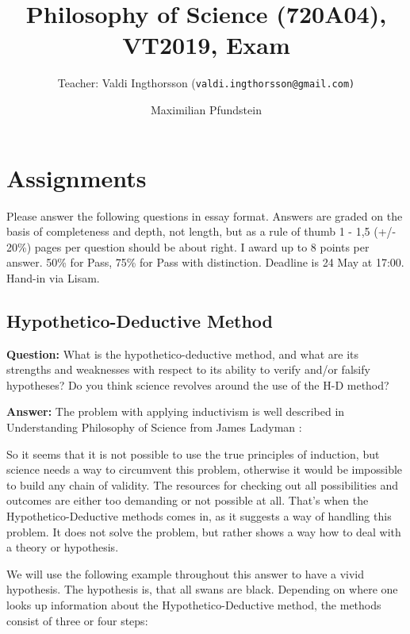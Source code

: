 \documentclass[11pt]{scrartcl}
\title{Philosophy of Science (720A04), VT2019, Exam}
\subtitle{Teacher: Valdi Ingthorsson (\texttt{valdi.ingthorsson@gmail.com)}}
\author{Maximilian Pfundstein}
\begin{document}
\maketitle

\tableofcontents

\newpage

\section{Assignments}

Please answer the following questions in essay format. Answers are graded on the basis of completeness and depth, not length, but as a rule of thumb 1 - 1,5 (+/- 20\%) pages per question should be about right. I award up to 8 points per answer. 50\% for Pass, 75\% for Pass with distinction. Deadline is 24 May at 17:00. Hand-in via Lisam.

\subsection{Hypothetico-Deductive Method}

\textbf{Question:} What is the hypothetico-deductive method, and what are its strengths and weaknesses with respect to its ability to verify and/or falsify hypotheses? Do you think science revolves around the use of the H-D method?

\bigbreak

\textbf{Answer:} The problem with applying inductivism is well described in Understanding Philosophy of Science from James Ladyman \cite[p. 40]{ladyman}: 

So it seems that it is not possible to use the true principles of induction, but science needs a way to circumvent this problem, otherwise it would be impossible to build any chain of validity. The resources for checking out all possibilities and outcomes are either too demanding or not possible at all. That's when the Hypothetico-Deductive methods comes in, as it suggests a way of handling this problem. It does not solve the problem, but rather shows a way how to deal with a theory or hypothesis.

We will use the following example throughout this answer to have a vivid hypothesis. The hypothesis is, that all swans are black. Depending on where one looks up information about the Hypothetico-Deductive method, the methods consist of three or four steps:
\end{document}
